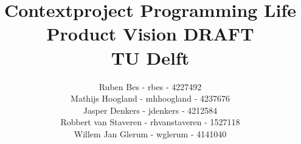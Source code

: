 \documentclass[a4paper]{article}
\title{
	{Contextproject Programming Life}\\
	{Product Vision DRAFT}\\
	{\large TU Delft}
}
\author{
	Ruben Bes - rbes - 4227492\\
	Mathijs Hoogland - mhhoogland - 4237676 \\
	Jasper Denkers - jdenkers - 4212584\\
	Robbert van Staveren - rhvanstaveren - 1527118\\
	Willem Jan Glerum - wglerum - 4141040
}
\begin{document}
\maketitle
\newpage



\newpage
\tableofcontents
\newpage







{}

\end{document}
